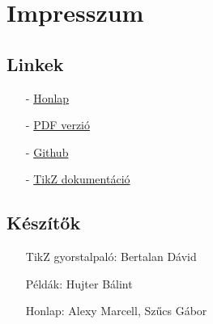 \chapter{Impresszum}

\section{Linkek}
\begin{enumerate}
    \item[-] \href{./index.html}{Honlap}
    \item[-] \href{./mainpage.pdf}{PDF verzió}
    \item[-] \href{https://github.com/a-gondolkodas-orome/latex-tutorial}{Github} 
    \item[-] \href{https://ctan.ijs.si/tex-archive/graphics/pgf/base/doc/pgfmanual.pdf}{TikZ dokumentáció} 
\end{enumerate}
        
\section{Készítők}
\begin{enumerate}
    \item[] TikZ gyorstalpaló: Bertalan Dávid
    \item[] Példák: Hujter Bálint
    \item[] Honlap: Alexy Marcell, Szűcs Gábor
\end{enumerate}
